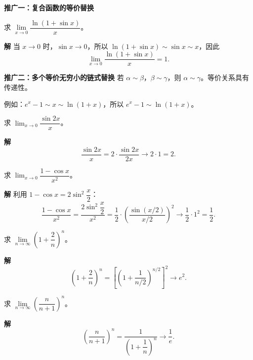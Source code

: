 \documentclass{ctexart}
\newenvironment{extra}{\begin{mdframed}[style=extrastyle, frametitle={* 选读内容（不要求掌握）}]}{\end{mdframed}}
\newenvironment{custom}[1]{\par\noindent \textbf{#1}\quad}{\par\vspace{1em}}
\begin{document}
\begin{example}[加减结构中的错误示例]
\begin{extra}
\begin{custom}{推广一：复合函数的等价替换}
\begin{example}
求 \(\lim\limits_{x \to 0} \dfrac{\ln(1 + \sin x)}{x}\)。
\end{example}
\begin{custom}{解}
当 \(x \to 0\) 时，\(\sin x \to 0\)，所以 \(\ln(1+\sin x) \sim \sin x \sim x\)，因此
\[
\lim_{x \to 0} \dfrac{\ln(1+\sin x)}{x} = 1.
\]
\end{custom}
\end{custom}

\begin{custom}{推广二：多个等价无穷小的链式替换}
若 \(\alpha \sim \beta\)，\(\beta \sim \gamma\)，则 \(\alpha \sim \gamma\)。等价关系具有传递性。

例如：\(e^x - 1 \sim x \sim \ln(1+x)\)，所以 \(e^x - 1 \sim \ln(1+x)\)。
\end{custom}
\end{extra}

\end{custom}

\begin{example}
求 \(\lim_{x \to 0} \dfrac{\sin 2x}{x}\)。
\end{example}

\begin{custom}{解}
\[
\dfrac{\sin 2x}{x} = 2 \cdot \dfrac{\sin 2x}{2x} \to 2 \cdot 1 = 2.
\]
\end{custom}

\begin{example}
求 \(\lim_{x \to 0} \dfrac{1 - \cos x}{x^2}\)。
\end{example}

\begin{custom}{解}
利用 \(1 - \cos x = 2 \sin^2 \dfrac{x}{2}\)：
\[
\dfrac{1 - \cos x}{x^2} = \dfrac{2 \sin^2 \dfrac{x}{2}}{x^2} = \dfrac{1}{2} \cdot \left( \dfrac{\sin (x/2)}{x/2} \right)^2 \to \dfrac{1}{2} \cdot 1^2 = \dfrac{1}{2}.
\]
\end{custom}

\begin{example}
求 \(\lim\limits_{n\to\infty} \left(1 + \dfrac{2}{n}\right)^n\)。
\end{example}
\begin{custom}{解}
\[
\left(1 + \dfrac{2}{n}\right)^n = \left[\left(1 + \dfrac{1}{n/2}\right)^{n/2}\right]^2 \to e^2.
\]
\end{custom}

\begin{example}
求 \(\lim\limits_{n\to\infty} \left(\dfrac{n}{n+1}\right)^n\)。
\end{example}
\begin{custom}{解}
\[
\left(\dfrac{n}{n+1}\right)^n = \dfrac{1}{\left(1 + \dfrac{1}{n}\right)^n} \to \dfrac{1}{e}.
\]
\end{custom}


\end{example}
\end{document}
